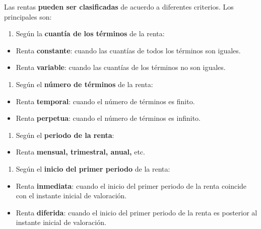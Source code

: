 \documentclass[
  letterpaper,
  DIV=11,
  numbers=noendperiod]{scrreprt}
\providecommand{\tightlist}{%
  \setlength{\itemsep}{0pt}\setlength{\parskip}{0pt}}\usepackage{longtable,booktabs,array}
\begin{document}
\begin{tcolorbox}
Las rentas \textbf{pueden ser clasificadas} de acuerdo a diferentes
criterios. Los principales son:

\begin{enumerate}
\def\labelenumi{\arabic{enumi}.}
\tightlist
\item
  Según la \textbf{cuantía de los términos} de la renta:
\end{enumerate}

\begin{itemize}
\tightlist
\item
  Renta \textbf{constante}: cuando las cuantías de todos los términos
  son iguales.
\item
  Renta \textbf{variable}: cuando las cuantías de los términos no son
  iguales.
\end{itemize}

\begin{enumerate}
\def\labelenumi{\arabic{enumi}.}
\setcounter{enumi}{1}
\tightlist
\item
  Según el \textbf{número de términos} de la renta:
\end{enumerate}

\begin{itemize}
\tightlist
\item
  Renta \textbf{temporal}: cuando el número de términos es finito.
\item
  Renta \textbf{perpetua}: cuando el número de términos es infinito.
\end{itemize}

\begin{enumerate}
\def\labelenumi{\arabic{enumi}.}
\setcounter{enumi}{2}
\tightlist
\item
  Según el \textbf{periodo de la renta}:
\end{enumerate}

\begin{itemize}
\tightlist
\item
  Renta \textbf{mensual, trimestral, anual,} etc.
\end{itemize}

\begin{enumerate}
\def\labelenumi{\arabic{enumi}.}
\setcounter{enumi}{3}
\tightlist
\item
  Según el \textbf{inicio del primer periodo} de la renta:
\end{enumerate}

\begin{itemize}
\tightlist
\item
  Renta \textbf{inmediata}: cuando el inicio del primer periodo de la
  renta coincide con el instante inicial de valoración.
\item
  Renta \textbf{diferida}: cuando el inicio del primer periodo de la
  renta es posterior al instante inicial de valoración.
\end{itemize}


\end{tcolorbox}
\end{document}

